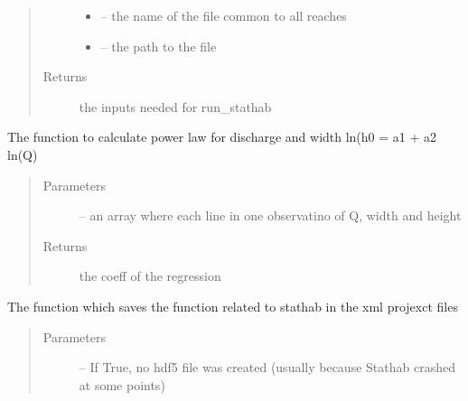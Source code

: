 \documentclass[letterpaper,10pt,english]{sphinxmanual}
\begin{document}
\begin{fulllineitems}
\begin{fulllineitems}
\begin{quote}
\begin{description}
\begin{itemize}
\item {} 
 -- the name of the file common to all reaches

\item {} 
 -- the path to the file

\end{itemize}

\item[{Returns}] \leavevmode
the inputs needed for run\_stathab

\end{description}\end{quote}

\end{fulllineitems}


\begin{fulllineitems}
\label{\detokenize{index:src.stathab_c.Stathab.power_law}}
The function to calculate power law for discharge and width
ln(h0 = a1 + a2 ln(Q)
\begin{quote}\begin{description}
\item[{Parameters}] \leavevmode
{} -- an array where each line in one observatino of Q, width and height

\item[{Returns}] \leavevmode
the coeff of the regression

\end{description}\end{quote}

\end{fulllineitems}


\begin{fulllineitems}
\label{\detokenize{index:src.stathab_c.Stathab.save_xml_stathab}}
The function which saves the function related to stathab in the xml projexct files
\begin{quote}\begin{description}
\item[{Parameters}] \leavevmode
{} -- If True, no hdf5 file was created (usually because Stathab crashed at some points)


\end{description}
\end{quote}
\end{fulllineitems}
\end{fulllineitems}
\end{document}
